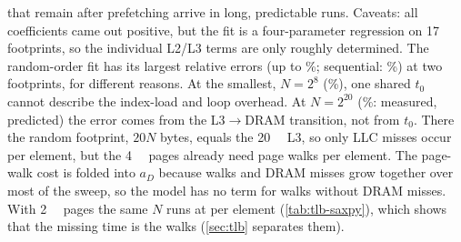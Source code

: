 that remain after prefetching arrive in long, predictable runs. Caveats: all coefficients came out positive,
but the fit is a four-parameter regression on 17 footprints, so the individual L2/L3 terms are only roughly
determined. The random-order fit has its largest relative errors (up to \%;
sequential: \%) at two footprints, for different reasons. At the smallest,
$N=2^{8}$ (\%), one shared $t_0$ cannot describe the index-load and loop overhead.
At $N=2^{20}$ (\%:  measured,
 predicted) the error comes from the L3$\to$DRAM transition,
not from $t_0$. There the random footprint, $20N$ bytes, equals the \qty{20}{\mebi\byte} L3, so only
 LLC misses occur per element, but the \qty{4}{\kibi\byte} pages already need
 page walks per element. The page-walk cost is folded into $a_D$ because walks and
DRAM misses grow together over most of the sweep, so the model has no term for walks without DRAM misses.
With \qty{2}{\mebi\byte} pages the same $N$ runs at  per element
(\cref{tab:tlb-saxpy}), which shows that the missing time is the walks (\cref{sec:tlb} separates them).
